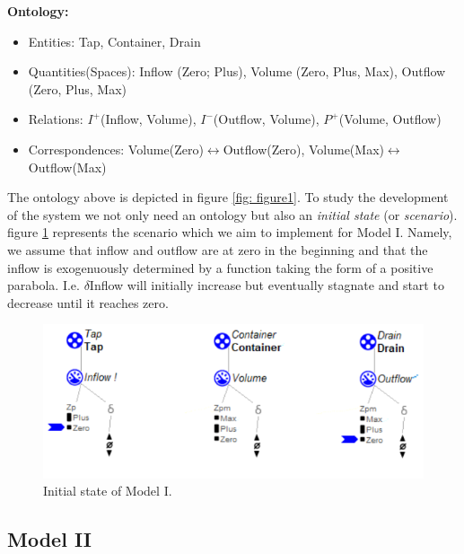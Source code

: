 \documentclass{article}
\begin{document}
\textbf{Ontology:}
\begin{itemize}
	\item Entities: Tap, Container, Drain
	\item Quantities(Spaces): Inflow (Zero; Plus), Volume (Zero, Plus, Max), Outflow (Zero, Plus, Max)
	\item Relations: $I^+$(Inflow, Volume), $I^-$(Outflow, Volume), $P^+$(Volume, Outflow)
	\item Correspondences: Volume(Zero)$\leftrightarrow$Outflow(Zero), Volume(Max)$\leftrightarrow$Outflow(Max)
\end{itemize}

The ontology above is depicted in figure \ref{fig: figure1}. To study the development of the system we not only need an ontology but also an \textit{initial state} (or \textit{scenario}). figure \ref{figure2} represents the scenario which we aim to implement for Model I. Namely, we assume that inflow and outflow are at zero in the beginning and that the inflow is exogenuously determined by a function taking the form of a positive parabola. I.e. $\delta$Inflow will initially increase but eventually stagnate and start to decrease until it reaches zero.


\begin{figure}[!h]
	\centering
	\includegraphics{Scenario_1.png}
	\caption{Initial state of Model I.}
	\label{figure2}
\end{figure}

\subsection {Model II}
\end{document}
